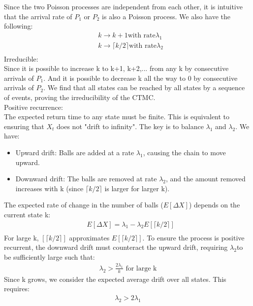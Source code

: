 \begin{solution}
    Since the two Poisson processes are independent from each other, it is intuitive that the arrival rate of $P_1$ or $P_2$ is also a Poisson process.  We also have the following:
    \begin{align*}
        &k \longrightarrow k+1 \text{with rate}\lambda_1\\
        &k \longrightarrow \lceil k/2 \rceil \text{with rate} \lambda_2 \\
    \end{align*}
    Irreducible:\\
    Since it is possible to increase k to k+1, k+2,... from any k by consecutive arrivals of $P_1$. And it is possible to decrease k all the way to 0 by consecutive arrivals of $P_2$. We find that all states can be reached by all states by a sequence of events, proving the irreducibility of the CTMC.
    \\
    Positive recurrence:\\
    The expected return time to any state must be finite. This is equivalent to ensuring that $X_t$ does not "drift to infinity". The key is to balance $\lambda_1$ and $\lambda_2$.
    We have:
    \begin{itemize}
        \item Upward drift: Balls are added at a rate $\lambda_1$, causing the chain to move upward.
        \item
        Downward drift: The balls are removed at rate $\lambda_2$, and the amount removed increases with k (since
        $\lceil k/2 \rceil$ is larger for larger
        k).
    \end{itemize}
    The expected rate of change in the number of balls ($E[\Delta X]$) depends on the current state
    k:
    \begin{align*}
        &E[\Delta X]=\lambda_1-\lambda_2 E[\lceil k/2 \rceil]\\
    \end{align*}
    For large k, $[\lceil k/2 \rceil]$ approximates $E[\lceil k/2 \rceil]$.
    To ensure the process is positive recurrent, the downward drift must counteract the upward drift, requiring $\lambda_2$to be sufficiently large such that:
    \begin{align*}
        \lambda_2 > \frac{2\lambda_1}{k} \text{ for large k}
    \end{align*}
    Since k grows, we consider the expected average drift over all states. This requires:
    \begin{align*}
        \lambda_2 > 2\lambda_1
    \end{align*}
\end{solution}


